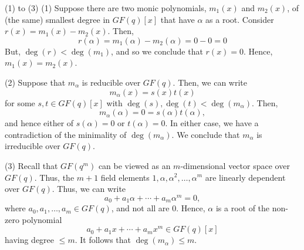 \begin{Proof}{ (1) to (3)}{}
    (1) Suppose there are two monic polynomials, $ m_1(x) $ and $ m_2(x) $,
    of (the same) smallest degree in $ GF(q)[x] $ that have $ \alpha $ as a root. Consider
    $ r(x)=m_1(x)-m_2(x) $. Then,
    \[ r(\alpha)=m_1(\alpha)-m_2(\alpha)=0-0=0 \]
    But, $ \deg(r)<\deg(m_1) $, and so we conclude that $ r(x)=0 $. Hence, $ m_1(x)=m_2(x) $.

    (2) Suppose that $ m_\alpha $ is reducible over $ GF(q) $. Then, we can write
    \[ m_\alpha(x)=s(x)t(x) \]
    for some $ s,t\in GF(q)[x] $ with $ \deg(s),\deg(t)<\deg(m_\alpha) $. Then,
    \[ m_\alpha(\alpha)=0=s(\alpha)t(\alpha), \]
    and hence either of $ s(\alpha)=0 $ or $ t(\alpha)=0 $. In either case,
    we have a contradiction of the minimality of $ \deg(m_\alpha) $. We conclude
    that $ m_\alpha $ is irreducible over $ GF(q) $.

    (3) Recall that $ GF(q^m) $ can be viewed as an $ m $-dimensional vector space
    over $ GF(q) $. Thus, the $ m+1 $ field elements $ 1,\alpha,\alpha^2,\ldots ,\alpha^m $
    are linearly dependent over $ GF(q) $. Thus, we can write
    \[ a_0+a_1\alpha+\cdots+a_m\alpha^m=0, \]
    where $ a_0,a_1,\ldots ,a_m\in GF(q) $, and not all are $ 0 $. Hence, $ \alpha $
    is a root of the non-zero polynomial
    \[ a_0+a_1x+\cdots+a_m x^m\in GF(q)[x] \]
    having degree $ \leqslant m $. It follows that $ \deg(m_\alpha) \leqslant m $.
\end{Proof}
